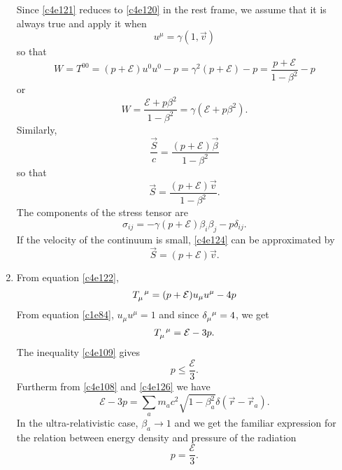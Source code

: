 \begin{enumerate}
Since \eqref{c4e121} reduces to \eqref{c4e120} in the rest frame, we assume 
that it is always true and apply it when
\[
u^\mu = \gamma(1, \vec{v})
\]
so that
\[
W = T^{00} = (p + \mathcal{E})u^0 u^0 - p = \gamma^2(p + \mathcal{E}) - p
= \frac{p + \mathcal{E}}{1 - \beta^2} - p
\]
or
\begin{equation}\label{c4e123}
W = \frac{\mathcal{E} + p\beta^2}{1 - \beta^2} = \gamma(\mathcal{E} + p\beta^2).
\end{equation}
Similarly,
\[
\frac{\vec{S}}{c} = \frac{(p + \mathcal{E})\vec{\beta}}{1 - \beta^2}
\]
so that
\begin{equation}\label{c4e124}
\vec{S} = \frac{(p + \mathcal{E})\vec{v}}{1 - \beta^2}.
\end{equation}
The components of the stress tensor are
\begin{equation}\label{c4e125}
\sigma_{ij} = -\gamma(p + \mathcal{E})\beta_i\beta_j - p\delta_{ij}.
\end{equation}
If the velocity of the continuum is small, \eqref{c4e124} can be approximated by
\begin{equation}
\vec{S} = (p + \mathcal{E})\vec{v}.
\end{equation}

\item From equation \eqref{c4e122},
\[
\tensor{T}{_\mu^\mu} = (p + \mathcal{E})u_\mu u^\mu - 4p
\]
From equation \eqref{c1e84}, $u_\mu u^\mu = 1$ and since $\tensor{\delta}
{_\mu^\mu} = 4$, we get
\begin{equation}\label{c4e126}
\tensor{T}{_\mu^\mu} = \mathcal{E} - 3p.
\end{equation}
The inequality \eqref{c4e109} gives
\begin{equation}\label{c4e127}
p \le \frac{\mathcal{E}}{3}.
\end{equation}
Furtherm from \eqref{c4e108} and \eqref{c4e126} we have
\begin{equation}\label{c4e128}
\mathcal{E} - 3p = 
\sum_a m_ac^2\sqrt{1 - \beta_a^2}\delta(\vec{r} - \vec{r}_a).
\end{equation}
In the ultra-relativistic case, $\beta_a \rightarrow 1$ and we get the familiar
expression for the relation between energy density and pressure of the radiation
\begin{equation}\label{c4e129}
p = \frac{\mathcal{E}}{3}.
\end{equation}

\end{enumerate}


